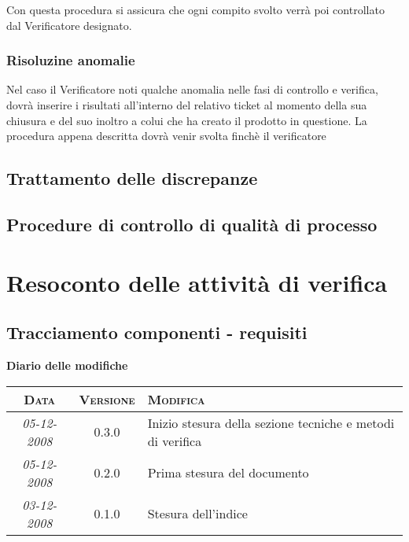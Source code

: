 \documentclass[11pt,a4paper]{article}
\newcommand{\modifiche} 
{
\newpage
\begin{center}
\textbf{Diario delle modifiche} \\
\bigskip
\begin{tabular}{|c|c|p{0.51\textwidth}|}
\hline
\textsc{Data} & \textsc{Versione} & \textsc{Modifica} \\
\hline
\hline
\textit{05-12-2008} & 0.3.0 & Inizio stesura della sezione tecniche e metodi di verifica \\
\hline
\textit{05-12-2008} & 0.2.0 & Prima stesura del documento \\
\hline
\textit{03-12-2008} & 0.1.0 & Stesura dell'indice \\
\hline
\end{tabular}
\end{center}
}
\begin{document}
Con questa procedura si assicura che ogni compito svolto verrà poi controllato dal Verificatore designato.
\subsubsection{Risoluzine anomalie}
Nel caso il Verificatore noti qualche anomalia nelle fasi di controllo e verifica, dovrà inserire i risultati all'interno del relativo ticket al momento della sua chiusura e del suo inoltro a colui che ha creato il prodotto in questione.
La procedura appena descritta dovrà venir svolta finchè il verificatore 


\subsection{Trattamento delle discrepanze}
\subsection{Procedure di controllo di qualità di processo}
\section{Resoconto delle attività di verifica}
\subsection{Tracciamento componenti - requisiti}

\modifiche
\end{document}
